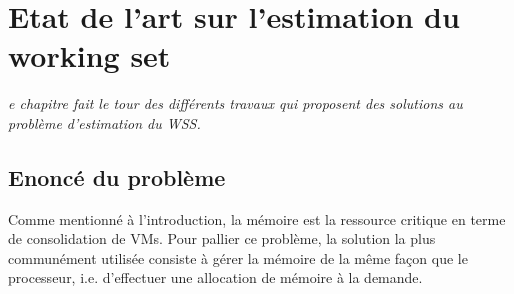 \let\textcircled=\pgftextcircled
\chapter{Etat de l'art sur l'estimation du working set}
\label{chap:etat_de_lart}

\textit{e chapitre fait le tour des différents travaux qui proposent des solutions au problème d'estimation du WSS.}


\newpage    
\section{Enoncé du problème}
Comme mentionné à l'introduction, la mémoire est la ressource critique en terme de consolidation de VMs. Pour pallier ce problème, la solution la plus communément utilisée consiste à gérer la mémoire de la même façon que le processeur, i.e. d'effectuer une allocation de mémoire à la demande. 

